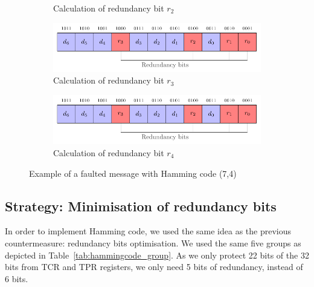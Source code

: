 \begin{figure}[ht]
\begin{subfigure}[b]{0.49\textwidth}
        \caption{Calculation of redundancy bit $r_2$}
        \label{fig:hamming_code_faulted_4}
    \end{subfigure}
    \hfill
    \begin{subfigure}[b]{0.49\textwidth}
        \includegraphics[width=\textwidth, page=15]{c5_countermeasures_dift/img/hamming_bit.pdf}
        \caption{Calculation of redundancy bit $r_3$}
        \label{fig:hamming_code_faulted_5}
    \end{subfigure}
    \hfill
    \begin{subfigure}[b]{0.49\textwidth}
        \includegraphics[width=\textwidth, page=16]{c5_countermeasures_dift/img/hamming_bit.pdf}
        \caption{Calculation of redundancy bit $r_4$}
        \label{fig:hamming_code_faulted_6}
    \end{subfigure}
    \caption{Example of a faulted message with Hamming code (7,4)}
    \label{fig:hamming_code_faulted}
\end{figure}

\subsection{Strategy: Minimisation of redundancy bits}

In order to implement Hamming code, we used the same idea as the previous countermeasure: redundancy bits optimisation. We used the same five groups as depicted in Table~\ref{tab:hammingcode_group}. As we only protect 22 bits of the 32 bits from TCR and TPR registers, we only need 5 bits of redundancy, instead of 6 bits.

